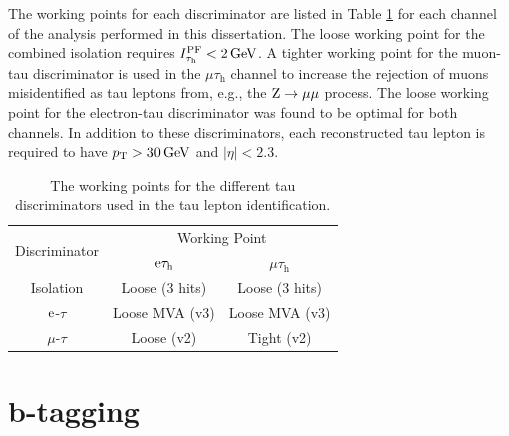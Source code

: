 \documentclass[12pt]{thesis}  %
\newcommand{\tauh}{\ensuremath{\tau_{\text{h}}}\xspace}
\newcommand{\Pe}{\ensuremath{\cmsSymbolFace{e}}\xspace}
\newcommand{\mutau}{\ensuremath{\mu\tauh}\xspace}
\newcommand{\etau}{\ensuremath{\Pe\tauh}\xspace}
\begin{document}
The working points for each discriminator are listed in Table \ref{tab:tauWP} for each channel of the analysis performed in this dissertation. The loose working point for the combined isolation requires $I^{\text{PF}}_{\tauh}<2\GeV$. A tighter working point for the muon-tau discriminator is used in the \mutau channel to increase the rejection of muons misidentified as tau leptons from, e.g., the $\mathrm{Z} \rightarrow \mu\mu$ process. The loose working point for the electron-tau discriminator was found to be optimal for both channels. In addition to these discriminators, each reconstructed tau lepton is required to have $p_{\mathrm{T}}>30\,\text{Ge\hspace{-.08em}V}$ and $|\eta|<2.3$.

\begin{table}[htb]
  \begin{center}
    \begin{tabular}{|c|c|c|}
      \hline
      \multirow{2}{*}{Discriminator} & \multicolumn{2}{|c|}{Working Point} \\
      \cline{2-3}
                                    & \etau & \mutau \\
      \hline
      Isolation                     & Loose (3 hits)   & Loose (3 hits) \\
      $\Pe$-$\tau$                  & Loose MVA (v3)   & Loose MVA (v3) \\
      $\mu$-$\tau$                  & Loose (v2)       & Tight (v2) \\
      \hline
    \end{tabular}
    \caption{The working points for the different tau discriminators used in the tau lepton identification. }
    \label{tab:tauWP}
  \end{center}
\end{table}

\section{b-tagging
\label{sec:b-tagging}}
\end{document}
